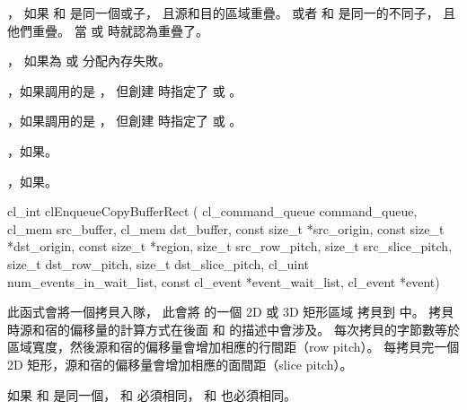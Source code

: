 \item {}，
如果  和  是同一個或子，
且源和目的區域重疊。
或者  和  是同一的不同子，
且他們重疊。
當  或
 時就認為重疊了。

\item {}，
如果為  或  分配內存失敗。

\item {}，如果調用的是 ，
但創建  時指定了  或 。

\item {}，如果調用的是 ，
但創建  時指定了  或 。

\item {}，如果\scdevfailres。
\item {}，如果\schostfailres。
\stopigBase


\startCLFUNC
cl_int clEnqueueCopyBufferRect (
			cl_command_queue command_queue,
			cl_mem src_buffer,
			cl_mem dst_buffer,
			const size_t *src_origin,
			const size_t *dst_origin,
			const size_t *region,
			size_t src_row_pitch,
			size_t src_slice_pitch,
			size_t dst_row_pitch,
			size_t dst_slice_pitch,
			cl_uint num_events_in_wait_list,
			const cl_event *event_wait_list,
			cl_event *event)
\stopCLFUNC

此函式會將一個拷貝入隊，
此會將  的一個 2D 或 3D 矩形區域
拷貝到  中。
拷貝時源和宿的偏移量的計算方式在後面  和  的描述中會涉及。
每次拷貝的字節數等於區域寬度，然後源和宿的偏移量會增加相應的行間距（row pitch）。
每拷貝完一個 2D 矩形，源和宿的偏移量會增加相應的面間距（slice pitch）。

\startnotepar
如果  和  是同一個，
 和  必須相同，
 和  也必須相同。
\stopnotepar

